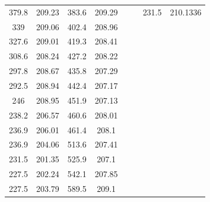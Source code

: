 \begin{center}
\begin{tabular}{|cccc||cc||cc|}
    379.8    & 209.23                  & 383.6 & 209.29                       &        &                             & 231.5    & 210.1336                           \\
    339      & 209.06                  & 402.4 & 208.96                       &        &                             &          &                                    \\
    327.6    & 209.01                  & 419.3 & 208.41                       &        &                             &          &                                    \\
    308.6    & 208.24                  & 427.2 & 208.22                       &        &                             &          &                                    \\
    297.8    & 208.67                  & 435.8 & 207.29                       &        &                             &          &                                    \\
    292.5    & 208.94                  & 442.4 & 207.17                       &        &                             &          &                                    \\
    246      & 208.95                  & 451.9 & 207.13                       &        &                             &          &                                    \\
    238.2    & 206.57                  & 460.6 & 208.01                       &        &                             &          &                                    \\
    236.9    & 206.01                  & 461.4 & 208.1                        &        &                             &          &                                    \\
    236.9    & 204.06                  & 513.6 & 207.41                       &        &                             &          &                                    \\
    231.5    & 201.35                  & 525.9 & 207.1                        &        &                             &          &                                    \\
    227.5    & 202.24                  & 542.1 & 207.85                       &        &                             &          &                                    \\
    227.5    & 203.79                  & 589.5 & 209.1                        &        &                             &          &                                    \\

\end{tabular}
\end{center}

